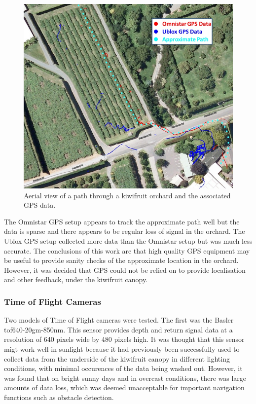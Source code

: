 \documentclass[preprint,authoryear,12pt]{elsarticle}
\begin{document}
    \begin{figure}[htb]
        \centering
        \includegraphics[width=\linewidth]{imgs/photos/gpsResults.png}
        \caption{
            Aerial view of a path through a kiwifruit orchard and the associated GPS data.
        }
        \label{fig:gpsResults}
    \end{figure}

    The Omnistar GPS setup appears to track the approximate path well but the data is sparse and there appears to be regular loss of signal in the orchard. The Ublox GPS setup collected more data than the Omnistar setup but was much less accurate. The conclusions of this work are that high quality GPS equipment may be useful to provide sanity checks of the approximate location in the orchard. However, it was decided that GPS could not be relied on to provide localisation and other feedback, under the kiwifruit canopy.

\subsubsection{Time of Flight Cameras}
    Two models of Time of Flight cameras were tested. The first was the Basler tof640-20gm-850nm. This sensor provides depth and return signal data at a resolution of 640 pixels wide by 480 pixels high. It was thought that this sensor migt work well in sunlight because it had previously been successfully used to collect data from the underside of the kiwifruit canopy in different lighting conditions, with minimal occurences of the data being washed out. However, it was found that on bright sunny days and in overcast conditions, there was large amounts of data loss, which was deemed unacceptable for important navigation functions such as obstacle detection.
\end{document}
